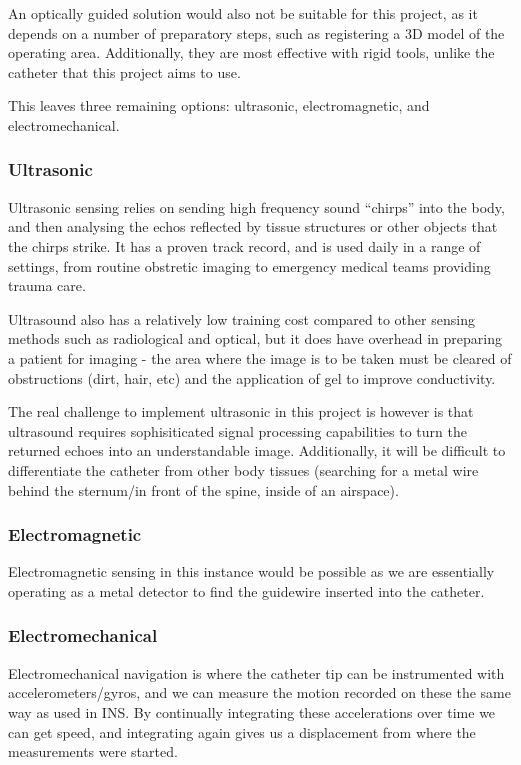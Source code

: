 \documentclass[a4paper]{article}
\begin{document}
        An optically guided solution would also not be suitable for this project, as it depends on a number of preparatory steps, such as registering a 3D model of the operating area. Additionally, they are most effective with rigid tools, unlike the catheter that this project aims to use.

        This leaves three remaining options: ultrasonic, electromagnetic, and electromechanical.

            \subsubsection{Ultrasonic}
            Ultrasonic sensing relies on sending high frequency sound ``chirps'' into the body, and then analysing the echos reflected by tissue structures or other objects that the chirps strike. It has a proven track record, and is used daily in a range of settings, from routine obstretic imaging to emergency medical teams providing trauma care.

            Ultrasound also has a relatively low training cost compared to other sensing methods such as radiological and optical, but it does have overhead in preparing a patient for imaging - the area where the image is to be taken must be cleared of obstructions (dirt, hair, etc) and the application of gel to improve conductivity.

            The real challenge to implement ultrasonic in this project is however is that ultrasound requires sophisiticated signal processing capabilities to turn the returned echoes into an understandable image. Additionally, it will be difficult to differentiate the catheter from other body tissues (searching for a metal wire behind the sternum\slash in front of the spine, inside of an airspace).

            \subsubsection{Electromagnetic}
            Electromagnetic sensing in this instance would be possible as we are essentially operating as a metal detector to find the guidewire inserted into the catheter.

            \subsubsection{Electromechanical}
            Electromechanical navigation is where the catheter tip can be instrumented with accelerometers/gyros, and we can measure the motion recorded on these the same way as used in INS. By continually integrating these accelerations over time we can get speed, and integrating again gives us a displacement from where the measurements were started.
\end{document}
